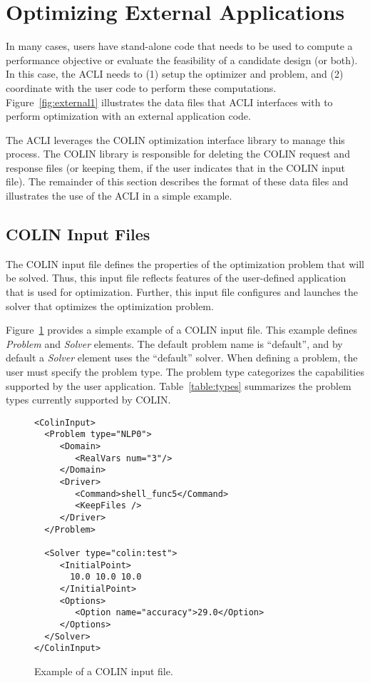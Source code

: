 \section{Optimizing External Applications}

In many cases, users have stand-alone code that needs to be used to compute a performance objective or evaluate the feasibility of a candidate design (or both). In this case, the ACLI needs to (1) setup the optimizer and problem, and (2) coordinate with the user code to perform these computations. Figure~\ref{fig:external1} illustrates the data files that ACLI interfaces with to perform optimization with an external application code.

The ACLI leverages the COLIN optimization interface library to manage this process.  The COLIN library is responsible for deleting the COLIN request and response files (or keeping them, if the user indicates that in the COLIN input file). The remainder of this section describes the format of these data files and illustrates the use of the ACLI in a simple example.

\subsection{COLIN Input Files}

The COLIN input file defines the properties of the optimization problem that will be solved. Thus, this input file reflects features of the user-defined application that is used for optimization. Further, this input file configures and launches the solver that optimizes the optimization problem.

Figure~\ref{fig:colin-input1} provides a simple example of a COLIN input file.  This example defines \emph{Problem} and \emph{Solver} elements.  The default problem name is ``default'', and by default a \emph{Solver} element uses the ``default'' solver.  When defining a problem, the user must specify the problem type.  The problem type categorizes the capabilities supported by the user application.  Table~\ref{table:types} summarizes the problem types currently supported by COLIN.

\begin{figure}[htb]
\begin{lstlisting}
<ColinInput>
  <Problem type="NLP0">
     <Domain>
        <RealVars num="3"/>
     </Domain>
     <Driver>
        <Command>shell_func5</Command>
        <KeepFiles />
     </Driver>
  </Problem>

  <Solver type="colin:test">
     <InitialPoint>
       10.0 10.0 10.0
     </InitialPoint>
     <Options>
        <Option name="accuracy">29.0</Option>
     </Options>
  </Solver>
</ColinInput>
\end{lstlisting}
\caption{Example of a COLIN input file.\label{fig:colin-input1}}
\end{figure}

